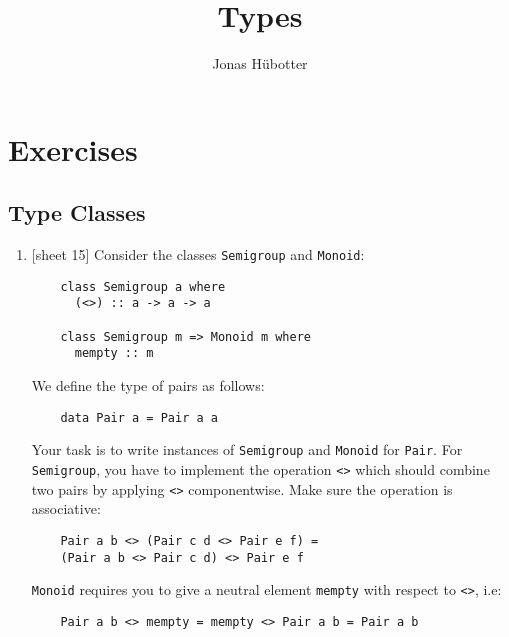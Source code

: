 \documentclass{article}
\title{Types}
\author{Jonas Hübotter}
\def\code#1{\texttt{#1}}
\begin{document}
\maketitle

\section{Exercises}

\subsection{Type Classes}
\begin{enumerate}
    \item {[sheet 15]} Consider the classes \code{Semigroup} and \code{Monoid}:
        \begin{verbatim}
    class Semigroup a where
      (<>) :: a -> a -> a

    class Semigroup m => Monoid m where
      mempty :: m
        \end{verbatim}
        We define the type of pairs as follows:
        \begin{verbatim}
    data Pair a = Pair a a
        \end{verbatim}
        Your task is to write instances of \code{Semigroup} and \code{Monoid} for \code{Pair}. For \code{Semigroup}, you have to implement the operation \code{<>} which should combine two pairs by applying \code{<>} componentwise. Make sure the operation is associative:
        \begin{verbatim}
    Pair a b <> (Pair c d <> Pair e f) =
    (Pair a b <> Pair c d) <> Pair e f
        \end{verbatim}
        \code{Monoid} requires you to give a neutral element \code{mempty} with respect to \code{<>}, i.e:
        \begin{verbatim}
    Pair a b <> mempty = mempty <> Pair a b = Pair a b
        \end{verbatim}


\end{enumerate}
\end{document}
